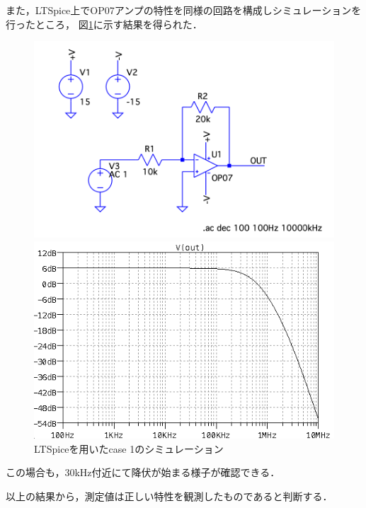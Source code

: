 \documentclass[dvipdfmx,titlepage,a4j]{jsarticle}  %
\begin{document}
また，LTSpice上でOP07アンプの特性を同様の回路を構成しシミュレーションを行ったところ，
図\ref{fig:gr:case1sim}に示す結果を得られた．
\begin{figure}[H]
  \centering
  \begin{minipage}{8cm}
    \centering
    \includegraphics[keepaspectratio, scale=0.2]{../image/case1sim.png}
  \end{minipage}
  \begin{minipage}{8cm}
    \centering
    \includegraphics[keepaspectratio, scale=0.35]{../image/case1simout.png}
  \end{minipage}
  \caption{LTSpiceを用いたcase 1のシミュレーション}
  \label{fig:gr:case1sim}
\end{figure}
この場合も，30kHz付近にて降伏が始まる様子が確認できる．

以上の結果から，測定値は正しい特性を観測したものであると判断する．
\end{document}
